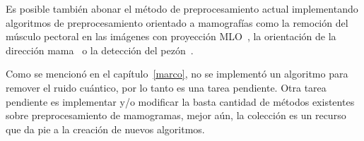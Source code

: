 Es posible también abonar el método de preprocesamiento actual implementando
algoritmos de preprocesamiento orientado a mamografías como la remoción del
músculo pectoral en las imágenes con proyección MLO~\cite{raba2005breast}, la
orientación de la dirección mama~\cite{masek2003automatic} o la detección del
pezón~\cite{mendez1996automatic}.

Como se mencionó en el capítulo~\ref{marco}, no se implementó un algoritmo para
remover el ruido cuántico, por lo tanto es una tarea pendiente. Otra tarea
pendiente es implementar y/o modificar la basta cantidad de métodos existentes
sobre preprocesamiento de mamogramas, mejor aún, la colección es un recurso que
da pie a la creación de nuevos algoritmos.

